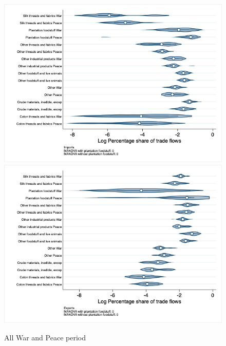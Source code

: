 \documentclass[12pt,a4paper,notitlepage,english]{article}
\begin{document}
\begin{appendix}
\begin{figure}[h!]
\caption{All War and Peace period}
\label{peace_war_nat_distr_aggr}
\includegraphics[scale=.4]{peace_war_nat_distr_Iaggr}
\includegraphics[scale=.4]{peace_war_nat_distr_Xaggr}
\end{figure}


\end{appendix}
\end{document}
